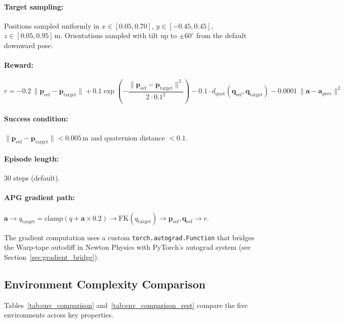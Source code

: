 \documentclass[11pt,a4paper]{article}
\newcommand{\bpf}{\mathbf{p}}
\newcommand{\ba}{\mathbf{a}}
\begin{document}
\paragraph{Target sampling:} Positions sampled uniformly in $x \in [0.05, 0.70]$, $y \in [-0.45, 0.45]$, $z \in [0.05, 0.95]$\,m. Orientations sampled with tilt up to $\pm 60^\circ$ from the default downward pose.

\paragraph{Reward:}
\begin{equation}
  r = -0.2\,\|\bpf_{\text{eef}} - \bpf_{\text{target}}\| + 0.1\exp\!\left(-\frac{\|\bpf_{\text{eef}} - \bpf_{\text{target}}\|^2}{2 \cdot 0.1^2}\right) - 0.1 \cdot d_{\text{quat}}(\mathbf{q}_{\text{eef}}, \mathbf{q}_{\text{target}}) - 0.0001\,\|\ba - \ba_{\text{prev}}\|^2
  \label{eq:fr_reward}
\end{equation}

\paragraph{Success condition:} $\|\bpf_{\text{eef}} - \bpf_{\text{target}}\| < 0.005$\,m and quaternion distance $< 0.1$.

\paragraph{Episode length:} 30 steps (default).

\paragraph{APG gradient path:} $\ba \rightarrow q_{\text{target}} = \text{clamp}(q + \ba \times 0.2) \rightarrow \text{FK}(q_{\text{target}}) \rightarrow \bpf_{\text{eef}}, \mathbf{q}_{\text{eef}} \rightarrow r$.

The gradient computation uses a custom \texttt{torch.autograd.Function} that bridges the Warp-tape autodiff in Newton Physics with PyTorch's autograd system (see Section~\ref{sec:gradient_bridge}).

\subsection{Environment Complexity Comparison}
\label{sec:env_comparison}

Tables~\ref{tab:env_comparison} and~\ref{tab:env_comparison_rest} compare the five environments across key properties.
\end{document}

